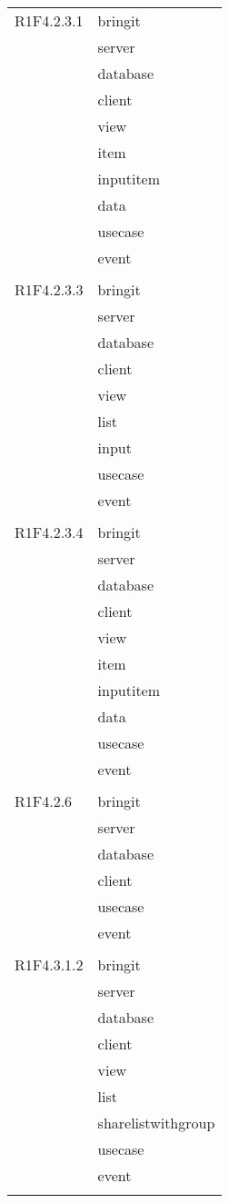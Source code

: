 \begin{center}
\begin{longtable}{|p{7cm}|p{7cm}|}
		R1F4.2.3.1 & bringit \\ & server \\ & database \\ & client \\ & view \\ & item \\ & inputitem \\ & data \\ & usecase \\ & event \\ & \\ \hline
		R1F4.2.3.3 & bringit \\ & server \\ & database \\ & client \\ & view \\ & list \\ & input \\ & usecase \\ & event \\ & \\ \hline
		R1F4.2.3.4 & bringit \\ & server \\ & database \\ & client \\ & view \\ & item \\ & inputitem \\ & data \\ & usecase \\ & event \\ & \\ \hline
		R1F4.2.6 & bringit \\ & server \\ & database \\ & client \\ & usecase \\ & event \\ & \\ \hline
		R1F4.3.1.2 & bringit \\ & server \\ & database \\ & client \\ & view \\ & list \\ & sharelistwithgroup \\ & usecase \\ & event \\ & \\ \hline

\end{longtable}
\end{center}
